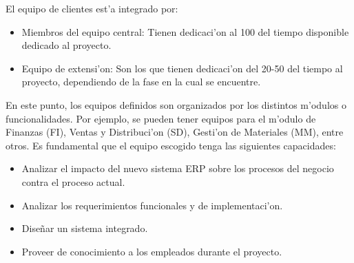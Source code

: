 El equipo de clientes est'a integrado por:
\begin{itemize}
\item Miembros del equipo central: Tienen dedicaci'on al 100 del tiempo disponible dedicado al proyecto.
\item Equipo de extensi'on: Son los que tienen dedicaci'on del 20-50 del tiempo al proyecto, dependiendo de la fase en la cual se encuentre.
\end{itemize}
En este punto, los equipos definidos son organizados por los distintos m'odulos o funcionalidades. Por ejemplo, se pueden tener equipos para el m'odulo de Finanzas (FI), Ventas y Distribuci'on (SD), Gesti'on de Materiales (MM), entre otros. 
Es fundamental que el equipo escogido tenga las siguientes capacidades:
\begin{itemize}
\item Analizar el impacto del nuevo sistema ERP sobre los procesos del negocio contra el proceso actual.
\item Analizar los requerimientos funcionales y de implementaci'on. 
\item Dise\~nar un sistema integrado.
\item Proveer de conocimiento a los empleados durante el proyecto.
\end{itemize}
